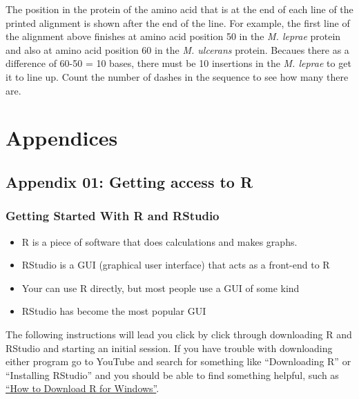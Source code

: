 \documentclass[
]{book}
\providecommand{\tightlist}{%
  \setlength{\itemsep}{0pt}\setlength{\parskip}{0pt}}
\begin{document}
The position in the protein of the amino acid that is at the end of each line of the printed alignment is shown after the end of the line. For example, the first line of the alignment above finishes at amino acid position 50 in the \emph{M. leprae} protein and also at amino acid position 60 in the \emph{M. ulcerans} protein. Becaues there as a difference of 60-50 = 10 bases, there must be 10 insertions in the \emph{M. leprae} to get it to line up. Count the number of dashes in the sequence to see how many there are.

\hypertarget{part-appendices}{%
\part{Appendices}\label{part-appendices}}

\hypertarget{section}{%
\subsection*{}\label{section}}

\hypertarget{appendix-01-getting-access-to-r}{%
\chapter*{Appendix 01: Getting access to R}\label{appendix-01-getting-access-to-r}}

\hypertarget{getting-started-with-r-and-rstudio}{%
\section{Getting Started With R and RStudio}\label{getting-started-with-r-and-rstudio}}

\begin{itemize}
\tightlist
\item
  R is a piece of software that does calculations and makes graphs.
\item
  RStudio is a GUI (graphical user interface) that acts as a front-end to R
\item
  Your can use R directly, but most people use a GUI of some kind
\item
  RStudio has become the most popular GUI
\end{itemize}

The following instructions will lead you click by click through downloading R and RStudio and starting an initial session. If you have trouble with downloading either program go to YouTube and search for something like ``Downloading R'' or ``Installing RStudio'' and you should be able to find something helpful, such as \href{https://www.youtube.com/watch?v=GYdmkLgV9n8}{``How to Download R for Windows''}.
\end{document}
